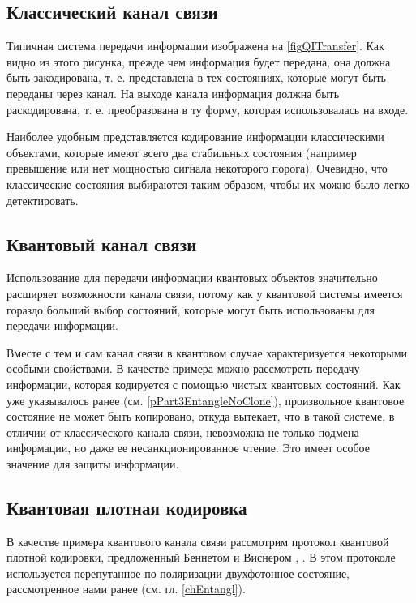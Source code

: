 \subsection{Классический канал связи}

Типичная система передачи информации изображена на
\autoref{figQITransfer}. Как видно из этого рисунка, прежде чем
информация будет передана, она должна быть закодирована,
т. е. представлена в тех состояниях, которые могут быть переданы через
канал. На выходе канала информация должна быть раскодирована,
т. е. преобразована в ту форму, которая использовалась на входе. 

Наиболее удобным представляется кодирование информации классическими
объектами, которые имеют всего два стабильных состояния (например
превышение или нет мощностью сигнала некоторого порога). Очевидно, что
классические состояния выбираются таким образом, чтобы их можно было
легко детектировать. 

\subsection{Квантовый канал связи}

Использование для передачи информации квантовых объектов значительно
расширяет возможности канала связи, потому как у квантовой системы
имеется гораздо больший выбор состояний, которые могут быть использованы для
передачи информации.

Вместе с тем и сам канал связи в квантовом случае характеризуется
некоторыми особыми свойствами. В качестве примера можно рассмотреть
передачу информации, которая кодируется с помощью чистых квантовых
состояний. Как уже указывалось ранее (см. \ref{pPart3EntangleNoClone}),
произвольное квантовое состояние не может быть копировано, откуда
вытекает, что в такой системе, в отличии от классического канала связи,
невозможна не только подмена информации, но даже ее
несанкционированное чтение. Это имеет особое значение для защиты
информации. 

\subsection{Квантовая плотная кодировка}
\label{subsecPart3QuantInfoBigCoding}
В качестве примера квантового канала связи рассмотрим протокол
квантовой плотной кодировки, предложенный Беннетом и Виснером
\cite{bBennettWiesner}, \cite{bDenseCodeExp}. В этом протоколе
используется перепутанное по поляризации двухфотонное состояние,
рассмотренное нами ранее  (см. гл. \ref{chEntangl}).  

